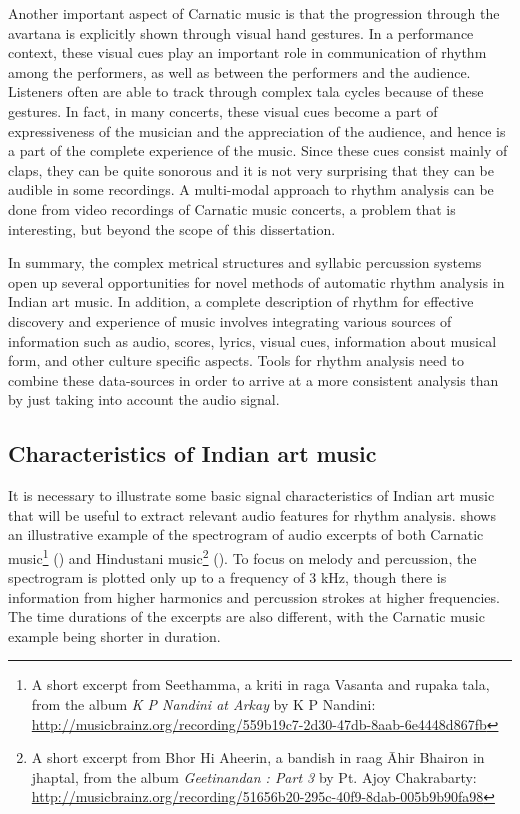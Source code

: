 Another important aspect of Carnatic music is that the progression through the \gls{avartana} is explicitly shown through visual hand gestures. In a performance context, these visual cues play an important role in communication of rhythm among the performers, as well as between the performers and the audience. Listeners often are able to track through complex \gls{tala} cycles because of these gestures. In fact, in many concerts, these visual cues become a part of expressiveness of the musician and the appreciation of the audience, and hence is a part of the complete experience of the music. Since these cues consist mainly of claps, they can be quite sonorous and it is not very surprising that they can be audible in some recordings. A multi-modal approach to rhythm analysis can be done from video recordings of Carnatic music concerts, a problem that is interesting, but beyond the scope of this dissertation. 

In summary, the complex metrical structures and syllabic percussion systems open up several opportunities for novel methods of automatic rhythm analysis in Indian art music. In addition, a complete description of rhythm for effective discovery and experience of music involves integrating various sources of information such as audio, scores, lyrics, visual cues, information about musical form, and other culture specific aspects. Tools for rhythm analysis need to combine these data-sources in order to arrive at a more consistent analysis than by just taking into account the audio signal. 
%
\subsection{Characteristics of Indian art music}\label{sec:probdef:signalcharacter}
It is necessary to illustrate some basic signal characteristics of Indian art music that will be useful to extract relevant audio features for rhythm analysis.  shows an illustrative example of the spectrogram of audio excerpts of both Carnatic music\footnote{A short excerpt from Seethamma, a \gls{kriti} in \gls{raga} Vasanta and \gls{rupaka} \gls{tala}, from the album \textit{K P Nandini at Arkay} by K P Nandini: \url{http://musicbrainz.org/recording/559b19c7-2d30-47db-8aab-6e4448d867fb}} () and Hindustani music\footnote{A short excerpt from Bhor Hi Aheerin, a \gls{bandish} in \gls{raag} Āhir Bhairon in \gls{jhaptal}, from the album \textit{Geetinandan : Part 3} by Pt. Ajoy Chakrabarty: \url{http://musicbrainz.org/recording/51656b20-295c-40f9-8dab-005b9b90fa98}} (). To focus on melody and percussion, the spectrogram is plotted only up to a frequency of 3 kHz, though there is information from higher harmonics and percussion strokes at higher frequencies. The time durations of the excerpts are also different, with the Carnatic music example being shorter in duration. 

